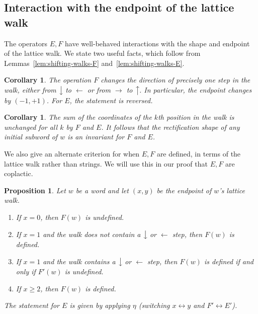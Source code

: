 \documentclass[10pt]{amsart}
\newtheorem{prop}[theorem]{Proposition}
\newtheorem{coro}[theorem]{Corollary}
\theoremstyle{definition}
\newcommand{\east}[1]{\ensuremath{\xrightarrow{\ #1\ }}}
\newcommand{\west}[1]{\ensuremath{\xleftarrow{\ #1\ }}}
\newcommand{\north}[1]{\ensuremath{\big \uparrow \!\text{\raisebox{.1ex}{\scriptsize $#1$}}}}
\newcommand{\south}[1]{\ensuremath{\big \downarrow \!\text{\raisebox{.1ex}{\scriptsize $#1$}}}}
\begin{document}
\subsection{Interaction with the endpoint of the lattice walk}

The operators $E,F$ have well-behaved interactions with the shape and endpoint of the lattice walk. We state two useful facts, which follow from Lemmas~\ref{lem:shifting-walks-F} and~\ref{lem:shifting-walks-E}.

\begin{coro}\label{cor:F-on-walk}
The operation $F$ changes the direction of precisely one step in the walk, either from $\south{}$ to $\west{~~}$ or from $\east{~~}$ to $\north{}$. In particular, the endpoint changes by $(-1,+1)$. For $E$, the statement is reversed.
\end{coro}

\begin{coro}
\label{cor:initial-subwords-dual}
The sum of the coordinates of the $k$th position in the walk is unchanged for all $k$ by $F$ and $E$. It follows that the rectification shape of any initial subword of $w$ is an invariant for $F$ and $E$.
\end{coro}

We also give an alternate criterion for when $E,F$ are defined, in terms of the lattice walk rather than strings. We will use this in our proof that $E,F$ are coplactic.

\begin{prop}
\label{prop:alternate-definedness}
Let $w$ be a word and let $(x,y)$ be the endpoint of $w$'s lattice walk.
\begin{enumerate}[label={(\roman*)}]
\item\label{prop5.16_i} %
If $x=0$, then $F(w)$ is undefined.
\item\label{prop5.16_ii} %
If $x = 1$ and the walk does not contain a $\south{}$ or $\west{}$ step, then $F(w)$ is defined.
\item\label{prop5.16_iii} %
If $x=1$ and the walk contains a $\south{}$ or $\west{}$ step, then $F(w)$ is defined if and only if $F'(w)$ is undefined.
\item\label{prop5.16_iv} %
If $x \geq 2$, then $F(w)$ is defined.
\end{enumerate}
The statement for $E$ is given by applying $\eta$ 
\textup{(}switching $x \leftrightarrow y$ and $F' \leftrightarrow E'$\textup{)}.
\end{prop}
\end{document}
